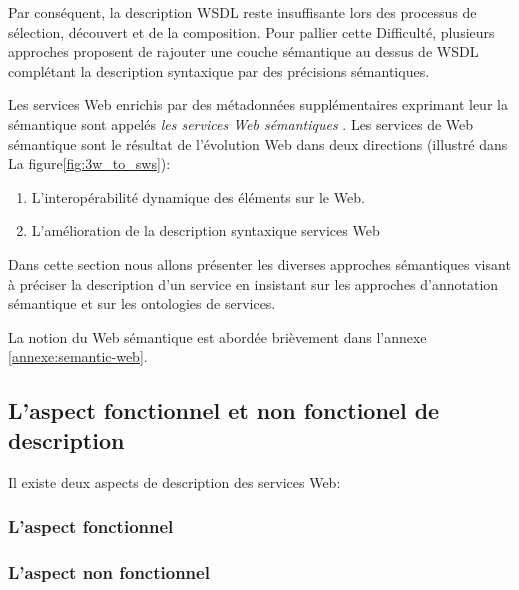 Par conséquent, la description \textsc{WSDL} reste insuffisante lors
des processus de sélection, découvert et de la composition. Pour
pallier cette Difficulté, plusieurs approches
\cite{sivashanmugam2003adding,mcilraith2001semantic,
  mcilraith2003bringing, fensel2002web} proposent de rajouter une
couche sémantique au dessus de \textsc{WSDL} complétant la description
syntaxique par des précisions sémantiques.


\newpage
Les services Web enrichis par des métadonnées supplémentaires
exprimant leur la sémantique sont appelés \textit{les services Web
sémantiques} \cite{fensel2002semantic, mcilraith2001semantic}. Les
services de Web sémantique sont le résultat de l'évolution Web dans
deux directions \cite{bartalos2011effective} (illustré dans La
figure\ref{fig:3w_to_sws}):

\begin{enumerate}
  \item L'interopérabilité dynamique des éléments sur le Web.
  \item L'amélioration de la description syntaxique services Web
\end{enumerate}

Dans cette section nous allons présenter les diverses approches
sémantiques visant à préciser la description d'un service en insistant
sur les approches d'annotation sémantique et sur les ontologies de
services.

La notion du Web sémantique est abordée brièvement dans l'annexe
\ref{annexe:semantic-web}.

\subsection{L'aspect fonctionnel et non fonctionel de description}
  \label{sec:func-vs-non-func}

  Il existe deux aspects de description des services Web:

    \subsubsection{L'aspect fonctionnel}
    \label{sec:aspect-fonctionnel}

    \subsubsection{L'aspect non fonctionnel}
    \label{sec:aspect-non-fonctionel}

